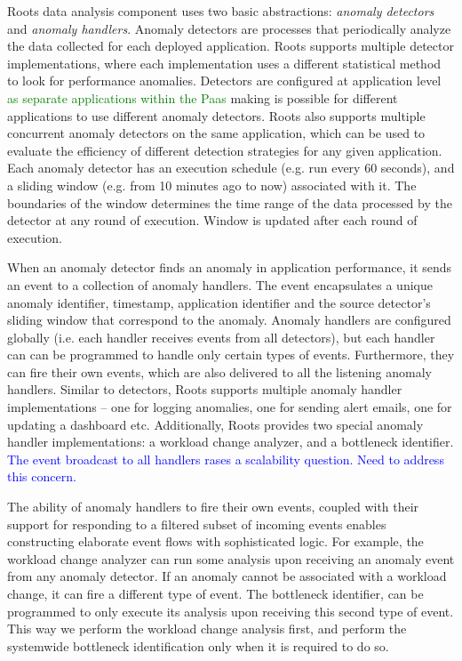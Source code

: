 Roots data analysis component uses two basic abstractions: \textit{anomaly detectors} 
and \textit{anomaly handlers}.
Anomaly detectors are processes that periodically analyze the data collected for
each deployed application. Roots supports multiple detector implementations, where each implementation
uses a different statistical method to look for performance anomalies. Detectors are configured
at application level \textcolor{green}{as separate applications within the Paas} 
making is possible for different applications to use different anomaly 
detectors. Roots also supports multiple concurrent anomaly detectors on the same application, which can be used
to evaluate the efficiency of different detection strategies for any given application. Each
anomaly detector has an execution schedule (e.g. run every 60 seconds), and a sliding window 
(e.g. from 10 minutes ago to now)
associated with it. The boundaries of the window determines the time range
of the data processed by the detector at any round of execution. Window is updated 
after each round of execution. 

When an anomaly detector finds an anomaly in application performance, it sends an event
to a collection of anomaly handlers. The event encapsulates a unique anomaly identifier, 
timestamp, application identifier and the source detector's sliding window that correspond to the
anomaly. Anomaly handlers are configured globally (i.e. each handler
receives events from all detectors), but each handler can can be programmed to handle only
certain types of events. Furthermore, they can fire their own events, which are also delivered to
all the listening anomaly handlers. Similar to detectors, Roots supports multiple anomaly handler
implementations -- one for logging anomalies, one for sending alert emails, one
for updating a dashboard etc. Additionally, Roots provides two special anomaly handler
implementations: a workload change analyzer, and a bottleneck identifier.
\textcolor{blue}{The event broadcast to all handlers rases a scalability
question.  Need to address this concern.}

The ability of anomaly handlers to fire their own events, coupled with their support
for responding to a filtered subset of incoming events enables constructing
elaborate event flows with sophisticated logic. For example, the workload
change analyzer can run some analysis upon receiving an anomaly event
from any anomaly detector. If an anomaly cannot be associated with a workload
change, it can fire a different type of event. The bottleneck identifier, can
be programmed to only execute its analysis upon receiving this second type of event.
This way we perform the workload change analysis first, and perform the
systemwide bottleneck identification only when it is required to do so.

